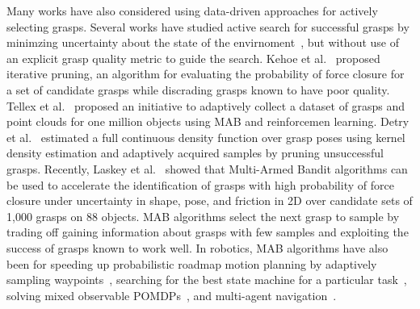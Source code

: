 Many works have also considered using data-driven approaches for actively selecting grasps.
Several works have studied active search for successful grasps by minimzing uncertainty about the state of the envirnoment~\cite{hsiao2007grasping, kahnactive, fischinger2015learning}, but without use of an explicit grasp quality metric to guide the search.
Kehoe et al.~\cite{kehoe2012estimating} proposed iterative pruning, an algorithm for evaluating the probability of force closure for a set of candidate grasps while discrading grasps known to have poor quality.
Tellex et al.~\cite{} proposed an initiative to adaptively collect a dataset of grasps and point clouds for one million objects using MAB and reinforcemen learning.
Detry et al.~\cite{detry2011learning} estimated a full continuous density function over grasp poses using kernel density estimation and adaptively acquired samples by pruning unsuccessful grasps.
Recently, Laskey et al.~\cite{laskey2015bandits} showed that Multi-Armed Bandit algorithms can be used to accelerate the identification of grasps with high probability of force closure under uncertainty in shape, pose, and friction in 2D over candidate sets of 1,000 grasps on 88 objects. 
MAB algorithms select the next grasp to sample by trading off gaining information about grasps with few samples and exploiting the success of grasps known to work well.
In robotics, MAB algorithms have also been for speeding up probabilistic roadmap motion planning by adaptively sampling waypoints~\cite{hsu2005hybrid}, searching for the best state machine for a particular task~\cite{matikainen2013multi}, solving mixed observable POMDPs~\cite{Mikko2015POMDP}, and multi-agent navigation~\cite{godoy2015adaptive}.

